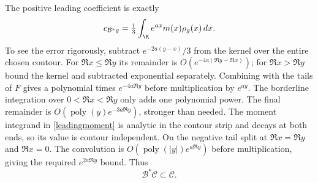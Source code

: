 The positive leading coefficient is exactly
\begin{equation}\label{leadingmoment}
 c_{\mathcal B^*g}=\tfrac13\int_\R e^{ax}m(x)\rho_g(x)\,dx.
\end{equation}
To see the error rigorously, subtract $e^{-2a(y-x)}/3$ from the
kernel over the entire chosen contour. For $\Re x\le\Re y$ its
remainder is $O(e^{-4a(\Re y-\Re x)})$; for $\Re x>\Re y$
bound the kernel and subtracted exponential separately. Combining
with the tails of $F$ gives a polynomial times $e^{-4a\Re y}$
before multiplication by $e^{ay}$. The borderline integration over
$0<\Re x<\Re y$ only adds one polynomial power. The final remainder
is $O(\operatorname{poly}(y)e^{-3a\Re y})$, stronger than needed.
The moment integrand in \eqref{leadingmoment} is analytic in the
contour strip and decays at both ends, so its value is contour
independent. On the negative tail split at $\Re x=\Re y$ and
$\Re x=0$. The convolution is
$O(\operatorname{poly}(|y|)e^{a\Re y})$ before multiplication,
giving the required $e^{2a\Re y}$ bound. Thus
\begin{equation}\label{classclosure}
 \mathcal B^*\mathcal C\subset\mathcal C.
\end{equation}

